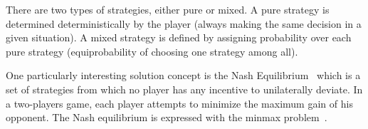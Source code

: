 There are two types of strategies, either pure or mixed.
A pure strategy is determined deterministically by the player (\ie always making the same decision in a given situation).
A mixed strategy is defined by assigning probability over each pure strategy (\eg equiprobability of choosing one strategy among all).

One particularly interesting solution concept is the Nash Equilibrium~\cite{nasheq} which is a set of strategies from which no player has any incentive to unilaterally deviate. 
In a two-players game, each player attempts to minimize the maximum gain of his opponent. 
The Nash equilibrium is expressed with the minmax problem~\cite{minmax}.